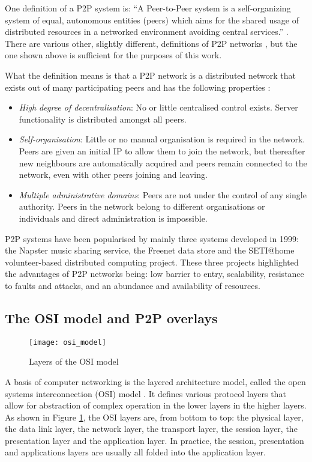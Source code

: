 One definition of a P2P system is: ``A Peer-to-Peer system is a self-organizing system of equal, autonomous entities (peers) which aims for the shared usage of distributed resources in a networked environment avoiding central services.'' \cite{oram_p2p_definition}. There are various other, slightly different, definitions of P2P networks \cite{p2p_definition}, but the one shown above is sufficient for the purposes of this work.

What the definition means is that a P2P network is a distributed network that exists out of many participating peers and has the following properties \cite{Rodrigues_acm_comms_p2p}:
%
\begin{itemize}
\item \emph{High degree of decentralisation}:  No or little centralised control exists. Server functionality is distributed amongst all peers.
\item \emph{Self-organisation}: Little or no manual organisation is required in the network. Peers are given an initial IP to allow them to join the network, but thereafter new neighbours are automatically acquired and peers remain connected to the network, even with other peers joining and leaving.
\item \emph{Multiple administrative domains}: Peers are not under the control of any single authority. Peers in the network belong to different organisations or individuals and direct administration is impossible.
\end{itemize}

P2P systems have been popularised by mainly three systems developed in 1999: the Napster music sharing service, the Freenet data store and the SETI@home volunteer-based distributed computing project. These three projects highlighted the advantages of P2P networks being: low barrier to entry, scalability, resistance to faults and attacks, and an abundance and availability of resources.

\subsection{The OSI model and P2P overlays}

\begin{figure}[htbp]
 \centering
 \texttt{[image: osi\_model]}
 \caption{Layers of the OSI model}
 \label{fig_osi_model}
\end{figure}
%
A basis of computer networking is the layered architecture model, called the open systems interconnection (OSI) model \cite{OSI_protocol_stack}. It defines various protocol layers that allow for abstraction of complex operation in the lower layers in the higher layers. As shown in Figure \ref{fig_osi_model}, the OSI layers are, from bottom to top: the physical layer, the data link layer, the network layer, the transport layer, the session layer, the presentation layer and the application layer. In practice, the session, presentation and applications layers are usually all folded into the application layer.

